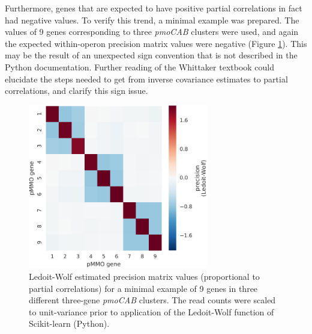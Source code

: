 Furthermore, genes that are expected to have positive partial correlations in fact had negative values.
To verify this trend, a minimal example was prepared.
The values of 9 genes corresponding to three \textit{pmoCAB} clusters were used, and again the expected within-operon precision matrix values were negative (Figure \ref{fig:pcor_pmocab}).
This may be the result of an unexpected sign convention that is not described in the Python documentation.
Further reading of the Whittaker textbook \cite{whittaker2009} could elucidate the steps needed to get from inverse covariance estimates to partial correlations, and clarify this sign issue.

\begin{figure}[H]
\centering
    \includegraphics[width=0.7\textwidth]{./tex/chapter3/figures/17045_LedoitWolf_results_on_9_pmo_genes--uncentered.pdf}
    \begin{singlespace}
    \caption[Partial correlation demo: three \textit{pmoCAB} clusters]{
        Ledoit-Wolf estimated precision matrix values (proportional to partial correlations) for a minimal example of 9 genes in three different three-gene \textit{pmoCAB} clusters.
        The read counts were scaled to unit-variance prior to application of the Ledoit-Wolf function of Scikit-learn (Python).
        }
    \label{fig:pcor_pmocab}
    \end{singlespace}
\end{figure}


